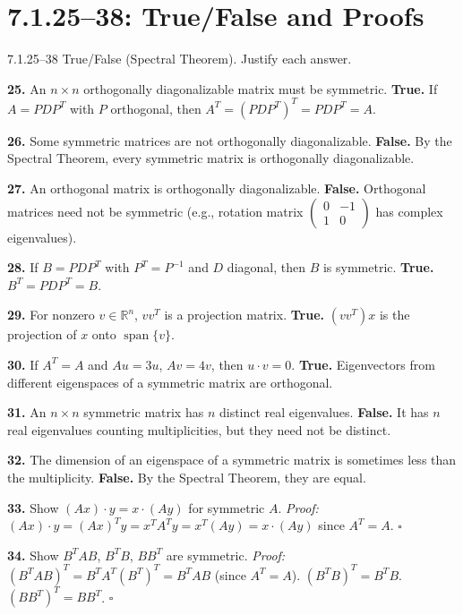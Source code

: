 \section*{7.1.25--38: True/False and Proofs}

\begin{exercise}{7.1.25--38}
True/False (Spectral Theorem). Justify each answer.
\end{exercise}
\begin{solution}
\textbf{25.} An $n\times n$ orthogonally diagonalizable matrix must be symmetric. \textbf{True.} If $A=PDP^T$ with $P$ orthogonal, then $A^T=(PDP^T)^T=PDP^T=A$.

\textbf{26.} Some symmetric matrices are not orthogonally diagonalizable. \textbf{False.} By the Spectral Theorem, every symmetric matrix is orthogonally diagonalizable.

\textbf{27.} An orthogonal matrix is orthogonally diagonalizable. \textbf{False.} Orthogonal matrices need not be symmetric (e.g., rotation matrix $\begin{pmatrix}0&-1\\1&0\end{pmatrix}$ has complex eigenvalues).

\textbf{28.} If $B=PDP^T$ with $P^T=P^{-1}$ and $D$ diagonal, then $B$ is symmetric. \textbf{True.} $B^T=PDP^T=B$.

\textbf{29.} For nonzero $v\in\mathbb{R}^n$, $vv^T$ is a projection matrix. \textbf{True.} $(vv^T)x$ is the projection of $x$ onto $\operatorname{span}\{v\}$.

\textbf{30.} If $A^T=A$ and $Au=3u$, $Av=4v$, then $u\cdot v=0$. \textbf{True.} Eigenvectors from different eigenspaces of a symmetric matrix are orthogonal.

\textbf{31.} An $n\times n$ symmetric matrix has $n$ distinct real eigenvalues. \textbf{False.} It has $n$ real eigenvalues counting multiplicities, but they need not be distinct.

\textbf{32.} The dimension of an eigenspace of a symmetric matrix is sometimes less than the multiplicity. \textbf{False.} By the Spectral Theorem, they are equal.

\textbf{33.} Show $(Ax)\cdot y = x\cdot(Ay)$ for symmetric $A$. \textit{Proof:} $(Ax)\cdot y = (Ax)^Ty = x^TA^Ty = x^T(Ay) = x\cdot(Ay)$ since $A^T=A$. $\square$

\textbf{34.} Show $B^TAB$, $B^TB$, $BB^T$ are symmetric. \textit{Proof:} $(B^TAB)^T = B^TA^T(B^T)^T = B^TAB$ (since $A^T=A$). $(B^TB)^T=B^TB$. $(BB^T)^T=BB^T$. $\square$


\end{solution}
